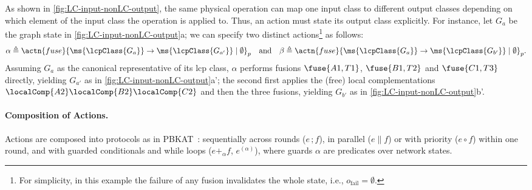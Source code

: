 As shown in \cref{fig:LC-input-nonLC-output}, the same physical operation can map one input class to different output classes depending on which element of the input class the operation is applied to. Thus, an action must state its output class explicitly.
%
For instance, let $G_a$ be the graph state in \cref{fig:LC-input-nonLC-output}a; we can specify two distinct actions\footnote{For simplicity, in this example the failure of any fusion invalidates the whole state, i.e., $o_{\mathrm{fail}} = \emptyset$.} %
as follows:
%
\[
\alpha \triangleq \actn{fuse}{\ms{\lcpClass{G_a}} \to \ms{\lcpClass{G_{a'}}} \mid \emptyset}_p
\quad\text{and}\quad
\beta \triangleq \actn{fuse}{\ms{\lcpClass{G_a}} \to \ms{\lcpClass{G_{b'}}} \mid \emptyset}_p.
\]
%
Assuming $G_a$ as the canonical representative of its \ac{lcp} class, $\alpha$ performs fusions $\fuse{A1,T1}$, $\fuse{B1,T2}$ and $\fuse{C1,T3}$ directly, yielding $G_{a'}$ as in \cref{fig:LC-input-nonLC-output}a';
the second first applies the (free) local complementations $\localComp{A2}\localComp{B2}\localComp{C2}$ and then the three fusions, yielding $G_{b'}$ as in \cref{fig:LC-input-nonLC-output}b'.

\paragraph{Composition of Actions.}
Actions are composed into protocols as in PBKAT~\cite{buckley2025pbkat}:
sequentially across rounds ($e \,; f$), in parallel ($e \parallel f$) or with priority ($e \circ f$) within one round, and with guarded conditionals and while loops ($e +_\alpha f$, $e^{(\alpha)}$), where guards $\alpha$ are predicates over network states.

